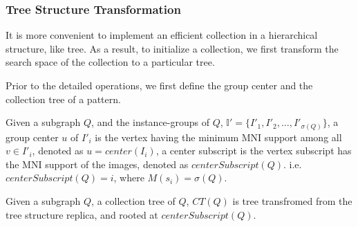 \subsubsection{Tree Structure Transformation}
It is more convenient to implement an efficient collection in a hierarchical structure, like tree. As a result, to initialize a collection, we first transform the search space of the collection to a particular tree.
\par Prior to the detailed operations, we first define the group center and the collection tree of a pattern.
\begin{defn}
	Given a subgraph $Q$, and the instance-groups of $Q$, $\mathbb{I'}=\{I'_1,I'_2,\ldots,I'_{\sigma(Q)}\}$, a group center $u$ of $I'_i$ is the vertex having the minimum MNI support among all $v\in I'_i$, denoted as $u=center(I_i)$, a center subscript is the vertex subscript has the MNI support of the images, denoted as $centerSubscript(Q)$. i.e. $centerSubscript(Q)=i$, where $M(s_i)=\sigma(Q)$.
\end{defn}
\begin{defn}
	Given a subgraph $Q$, a collection tree of $Q$, $CT(Q)$ is tree transfromed from the tree structure replica, and rooted at $centerSubscript(Q)$.
\end{defn}
